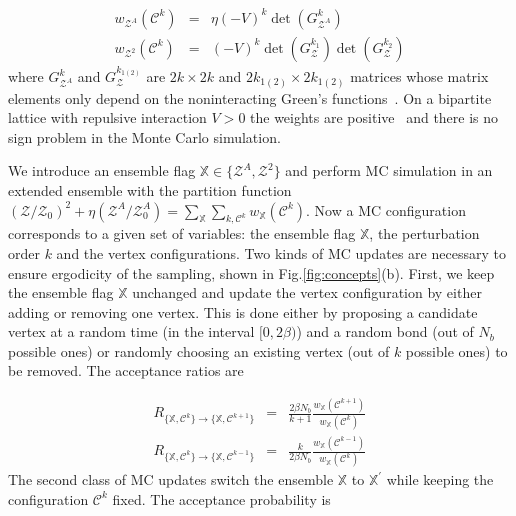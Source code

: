 \documentclass[twocolumn,english,prl,showpacs]{revtex4}
\begin{document}
\begin{eqnarray}
w_{\mathcal{Z}^{A}}(\mathcal{C}^{k}) &=& \eta (-V)^{k} \det(G^{k}_{\mathcal{Z}^{A}})  \label{eq:ZAweight} \\
w_{\mathcal{Z}^{2}}(\mathcal{C}^{k}) &= & (-V)^{k} \det(G^{k_{1}}_{\mathcal{Z}}) \det(G^{k_{2}}_{\mathcal{Z}})
\label{eq:Z2weight}
\end{eqnarray}
where $G^{k}_{\mathcal{Z}^{A}}$ and $G_{\mathcal{Z}}^{k_{1(2)}}$ are $2k\times 2k$ and $2k_{1(2)}\times 2k_{1(2)}$ matrices whose matrix elements only depend on the noninteracting Green's functions~\cite{SM}. On a bipartite lattice with repulsive interaction $V>0$ the weights are positive~\cite{Huffman:2014fj, CTQMCpaper} and there is no sign problem in the Monte Carlo simulation. 


We introduce an ensemble flag $\mathbb{X}\in \{\mathcal{Z}^{A}, \mathcal{Z}^{2}\}$ and perform MC simulation in an extended ensemble \cite{Burovski:2006hv, Humeniuk:2012cq} with the partition function $(\mathcal{Z}/\mathcal{Z}_{0})^{2} + \eta (\mathcal{Z}^{A}/\mathcal{Z}_{0}^{A}) = \sum_{\mathbb{X}}\sum_{k, \mathcal{C}^{k}}w_\mathbb{X} (\mathcal{C}^{k})$. Now a MC configuration corresponds to a given set of variables: the ensemble flag $\mathbb{X}$, the perturbation order $k$ and the vertex configurations. Two kinds of MC updates are necessary to ensure ergodicity of the sampling, shown in Fig.{\ref{fig:concepts}}(b). First, we keep the ensemble flag $\mathbb{X}$ unchanged and update the vertex configuration by either adding or removing one vertex. This is done either by proposing a candidate vertex at a random time (in the interval $[0, 2\beta)$) and a random bond (out of $N_{b}$ possible ones) or randomly choosing an existing vertex (out of $k$ possible ones) to be removed. The acceptance ratios are

\begin{eqnarray}
R_{\{\mathbb{X}, \mathcal{C}^{k}\}\rightarrow \{\mathbb{X}, \mathcal{C}^{k+1}\}} & =&  \frac{2\beta  N_{b}}{k+1} \frac{w_\mathbb{X}(\mathcal{C}^{k+1})}{w_\mathbb{X}(\mathcal{C}^{k})} \label{eq:add} \\
R_{\{\mathbb{X}, \mathcal{C}^{k}\}\rightarrow \{\mathbb{X}, \mathcal{C}^{k-1}\}} & =&  \frac{k}{2\beta  N_{b}} \frac{w_\mathbb{X}(\mathcal{C}^{k-1})}{w_\mathbb{X}(\mathcal{C}^{k})} \label{eq:remove}
\end{eqnarray}
The second class of MC updates switch the ensemble $\mathbb{X}$ to $\mathbb{X}^{\prime}$ while keeping the configuration $\mathcal{C}^{k}$ fixed. The acceptance probability is
\end{document}
